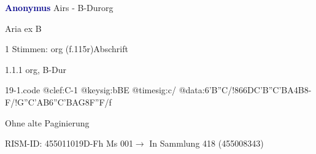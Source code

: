\documentclass[twocolumn, 12pt]{book}
\begin{document}
\par \vspace{16pt} \textcolor{darkblue}{\textbf{Anonymus  }}\hfillplus{\textbf{[19]}}\newline Airs - B-Dur\newline org
\par \begin{itshape}[f.115r, heading:] Aria ex B\end{itshape} 
\par \textcolor{darkblue}{}  1 Stimmen: org  (f.115r)\newline Abschrift
\par 1.1.1  org, B-Dur  
\begin{filecontents*}{19-1.code}
@clef:C-1
@keysig:bBE
@timesig:c/
@data:{6'B''C}/!{866DC'B}{''C'BA}4B8-F/!{G''C}{'AB}{6''C'BAG}{8F''F}/f
\end{filecontents*}
\newline %
\par Ohne alte Paginierung
\par RISM-ID: 455011019\newline D-Fh  Ms 001\newline $\rightarrow$ In Sammlung 418 (455008343)
      
\end{document}
